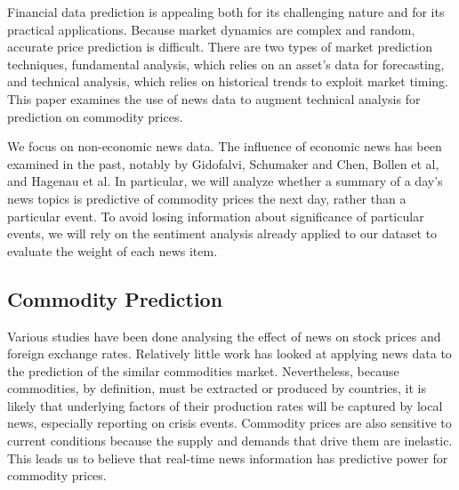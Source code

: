 Financial data prediction is appealing both for its challenging nature and for its practical applications. Because market dynamics are complex and random, accurate price prediction is difficult. There are two types of market prediction techniques, fundamental analysis, which relies on an asset's data for forecasting, and technical analysis, which relies on historical trends to exploit market timing\cite{schumaker2009textual}. This paper examines the use of news data to augment technical analysis for prediction on commodity prices.

We focus on non-economic news data. The influence of economic news has been examined in the past, notably by Gidofalvi, Schumaker and Chen, Bollen et al, and Hagenau et al\cite{gidofalvi2001using}\cite{schumaker2009textual}\cite{bollen2011twitter}\cite{hagenau2012automated}. In particular, we will analyze whether a summary of a day's news topics is predictive of commodity prices the next day, rather than a particular event. To avoid losing information about significance of particular events, we will rely on the sentiment analysis already applied to our dataset to evaluate the weight of each news item.

\subsection{Commodity Prediction}
Various studies have been done analysing the effect of news on stock prices\cite{mcqueen1993stock} and foreign exchange rates\cite{kamruzzaman2003svm}. Relatively little work has looked at applying news data to the prediction of the similar commodities market. Nevertheless, because commodities, by definition, must be extracted or produced by countries, it is likely that underlying factors of their production rates will be captured by local news, especially reporting on crisis events. Commodity prices are also sensitive to current conditions because the supply and demands that drive them are inelastic\cite{chen2008can}. This leads us to believe that real-time news information has predictive power for commodity prices. 

